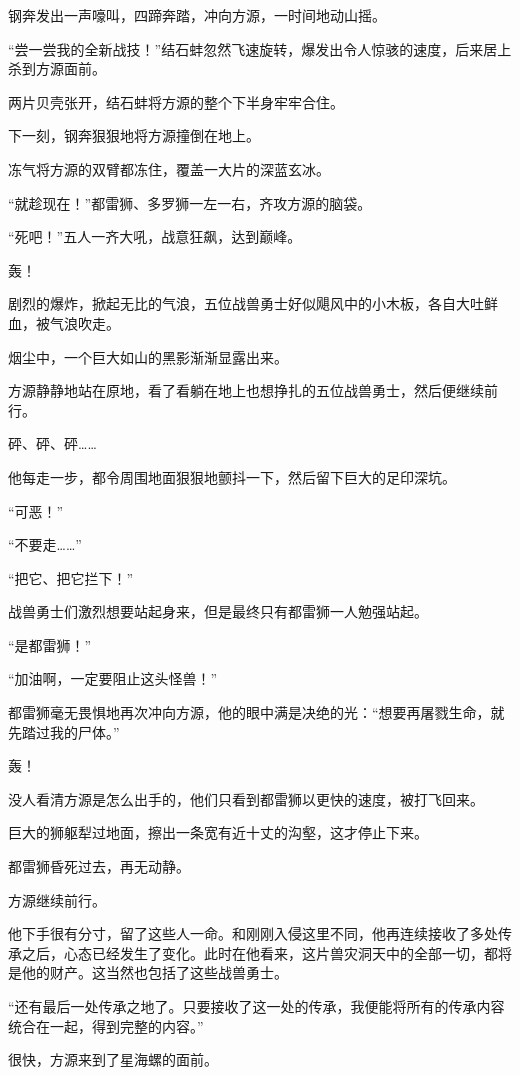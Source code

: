 \begin{this_body}
钢奔发出一声嚎叫，四蹄奔踏，冲向方源，一时间地动山摇。

“尝一尝我的全新战技！”结石蚌忽然飞速旋转，爆发出令人惊骇的速度，后来居上杀到方源面前。

两片贝壳张开，结石蚌将方源的整个下半身牢牢合住。

下一刻，钢奔狠狠地将方源撞倒在地上。

冻气将方源的双臂都冻住，覆盖一大片的深蓝玄冰。

“就趁现在！”都雷狮、多罗狮一左一右，齐攻方源的脑袋。

“死吧！”五人一齐大吼，战意狂飙，达到巅峰。

轰！

剧烈的爆炸，掀起无比的气浪，五位战兽勇士好似飓风中的小木板，各自大吐鲜血，被气浪吹走。

烟尘中，一个巨大如山的黑影渐渐显露出来。

方源静静地站在原地，看了看躺在地上也想挣扎的五位战兽勇士，然后便继续前行。

砰、砰、砰……

他每走一步，都令周围地面狠狠地颤抖一下，然后留下巨大的足印深坑。

“可恶！”

“不要走……”

“把它、把它拦下！”

战兽勇士们激烈想要站起身来，但是最终只有都雷狮一人勉强站起。

“是都雷狮！”

“加油啊，一定要阻止这头怪兽！”

都雷狮毫无畏惧地再次冲向方源，他的眼中满是决绝的光：“想要再屠戮生命，就先踏过我的尸体。”

轰！

没人看清方源是怎么出手的，他们只看到都雷狮以更快的速度，被打飞回来。

巨大的狮躯犁过地面，擦出一条宽有近十丈的沟壑，这才停止下来。

都雷狮昏死过去，再无动静。

方源继续前行。

他下手很有分寸，留了这些人一命。和刚刚入侵这里不同，他再连续接收了多处传承之后，心态已经发生了变化。此时在他看来，这片兽灾洞天中的全部一切，都将是他的财产。这当然也包括了这些战兽勇士。

“还有最后一处传承之地了。只要接收了这一处的传承，我便能将所有的传承内容统合在一起，得到完整的内容。”

很快，方源来到了星海螺的面前。


\end{this_body}
